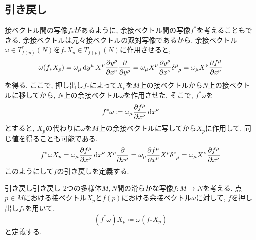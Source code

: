 \documentclass[../main.tex]{subfiles}
\begin{document}
    \subsection{引き戻し}
        接ベクトル間の写像$f_*$があるように, 余接ベクトル間の写像$f^*$を考えることもできる.
        余接ベクトルは元々接ベクトルの双対写像であるから,
        余接ベクトル$\omega \in T_{f(p)}^*(N)$を$f_*X_p \in T_{f(p)}(N)$に作用させると,
        \begin{equation*}
            \omega (f_*X_p) = \omega_\mu \dd{y^\mu} X^\nu \pdv{y^\rho}{x^\nu}\pdv{y^\rho}
                            = \omega_\mu X^\nu \pdv{y^\rho}{x^\nu} \delta\indices{^\mu_\rho}
                            = \omega_\mu X^\nu \pdv{f^\mu}{x^\nu}
        \end{equation*}
        を得る. ここで, 押し出し$f_*$によって$X_p$を$M$上の接ベクトルから$N$上の接ベクトルに移してから, $N$上の余接ベクトル$\omega$を作用させた.
        そこで, $f^*\omega$を
        \begin{equation}
            f^*\omega \coloneqq \omega_\mu \pdv{f^\mu}{x^\nu} \dd{x^\nu}
        \end{equation}
        とすると, $X_p$の代わりに$\omega$を$M$上の余接ベクトルに写してから$X_p$に作用して, 同じ値を得ることも可能である.
        \begin{equation*}
            f^*\omega X_p = \omega_\mu \pdv{f^\mu}{x^\nu} \dd{x^\nu} X^\rho \pdv{x^\rho}
                          = \omega_\mu \pdv{f^\mu}{x^\nu} X^\rho \delta\indices{^\nu_\rho}
                          = \omega_\mu X^\nu \pdv{f^\mu}{x^\nu}
        \end{equation*}
        このようにして$f$の引き戻しを定義する.
        \begin{dfn}{引き戻し}{引き戻し}
            2つの多様体$M,N$間の滑らかな写像$f : M \mapsto N$を考える.
            点$p \in M$における接ベクトル$X_p$と$f(p)$における余接ベクトル$\omega$に対して,
            $f$を押し出し$f_*$を用いて,
            \begin{equation}
                (f^*\omega) X_p \coloneqq \omega (f_*X_p)
            \end{equation}
            と定義する.
        \end{dfn}
\end{document}
